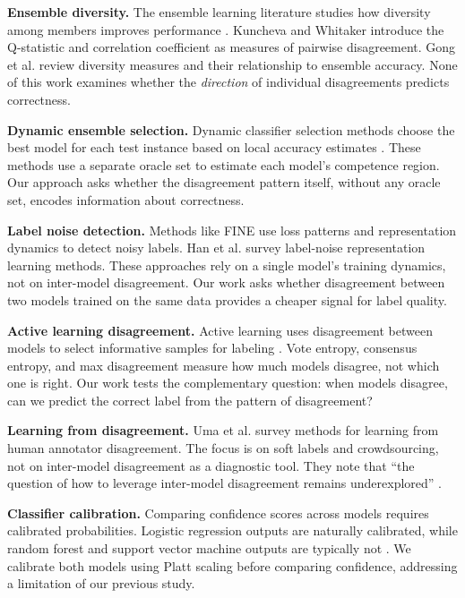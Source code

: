 \documentclass[11pt,letterpaper]{article}
\begin{document}
\noindent\textbf{Ensemble diversity.} The ensemble learning literature studies how diversity among members improves performance \citep{Kuncheva2003, Gong2018}. Kuncheva and Whitaker \citep{Kuncheva2003} introduce the Q-statistic and correlation coefficient as measures of pairwise disagreement. Gong et al. \citep{Gong2018} review diversity measures and their relationship to ensemble accuracy. None of this work examines whether the \textit{direction} of individual disagreements predicts correctness.

\noindent\textbf{Dynamic ensemble selection.} Dynamic classifier selection methods choose the best model for each test instance based on local accuracy estimates \citep{Rodriguez2017, Zhou2018}. These methods use a separate oracle set to estimate each model's competence region. Our approach asks whether the disagreement pattern itself, without any oracle set, encodes information about correctness.

\noindent\textbf{Label noise detection.} Methods like FINE \citep{Kim2021} use loss patterns and representation dynamics to detect noisy labels. Han et al. \citep{Han2020} survey label-noise representation learning methods. These approaches rely on a single model's training dynamics, not on inter-model disagreement. Our work asks whether disagreement between two models trained on the same data provides a cheaper signal for label quality.

\noindent\textbf{Active learning disagreement.} Active learning uses disagreement between models to select informative samples for labeling \citep{Danka2018}. Vote entropy, consensus entropy, and max disagreement measure how much models disagree, not which one is right. Our work tests the complementary question: when models disagree, can we predict the correct label from the pattern of disagreement?

\noindent\textbf{Learning from disagreement.} Uma et al. \citep{Uma2021} survey methods for learning from human annotator disagreement. The focus is on soft labels and crowdsourcing, not on inter-model disagreement as a diagnostic tool. They note that ``the question of how to leverage inter-model disagreement remains underexplored'' \citep{Uma2021}.

\noindent\textbf{Classifier calibration.} Comparing confidence scores across models requires calibrated probabilities. Logistic regression outputs are naturally calibrated, while random forest and support vector machine outputs are typically not \citep{Wang2023, Naeini2015}. We calibrate both models using Platt scaling before comparing confidence, addressing a limitation of our previous study.
\end{document}
